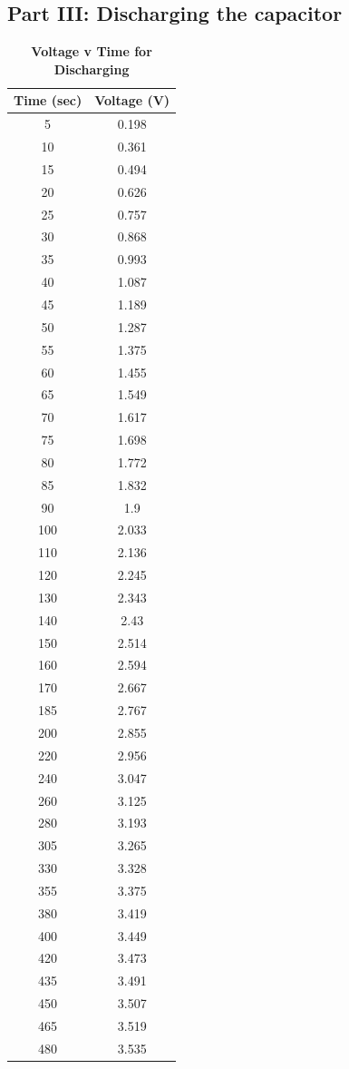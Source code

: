 \documentclass[titlepage]{article}
\begin{document}
	\subsection{Part III: Discharging the capacitor}
			\begin{table}[ht!]
				\centering
				\caption*{\textbf{Voltage v Time for Discharging}}
			\begin{tabular}{c|c}
				Time (sec) & Voltage (V)\\
				\hline
				5   & 0.198  \\
				10  & 0.361  \\
				15  & 0.494  \\
				20  & 0.626  \\
				25  & 0.757  \\
				30  & 0.868  \\
				35  & 0.993  \\
				40  & 1.087  \\
				45  & 1.189  \\
				50  & 1.287  \\
				55  & 1.375  \\
				60  & 1.455  \\
				65  & 1.549  \\
				70  & 1.617  \\
				75  & 1.698  \\
				80  & 1.772  \\
				85  & 1.832  \\
				90  & 1.9    \\
				100 & 2.033  \\
				110 & 2.136  \\
				120 & 2.245  \\
				130 & 2.343  \\
				140 & 2.43   \\
				150 & 2.514  \\
				160 & 2.594  \\
				170 & 2.667  \\
				185 & 2.767  \\
				200 & 2.855  \\
				220 & 2.956  \\
				240 & 3.047  \\
				260 & 3.125  \\
				280 & 3.193  \\
				305 & 3.265  \\
				330 & 3.328  \\
				355 & 3.375  \\
				380 & 3.419  \\
				400 & 3.449  \\
				420 & 3.473  \\
				435 & 3.491  \\
				450 & 3.507  \\
				465 & 3.519  \\
				480 & 3.535 
			\end{tabular}
		\end{table}
\end{document}
